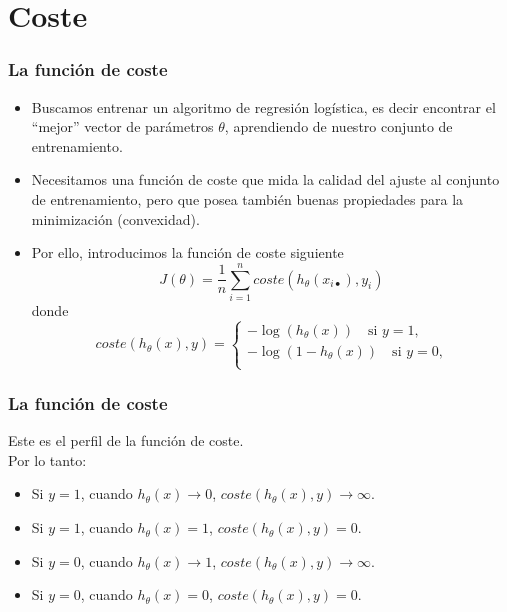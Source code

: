 \documentclass{beamer}
\begin{document}
\section{Coste}
\begin{frame}\frametitle{La función de coste}
  \begin{itemize}
  \item Buscamos entrenar un algoritmo de regresión logística, es decir encontrar el ``mejor'' vector de parámetros $\theta$, aprendiendo de nuestro conjunto de entrenamiento.
  \item<2->   Necesitamos una  función de coste que mida la calidad del ajuste al conjunto de entrenamiento, pero que posea también buenas propiedades para la minimización (convexidad).
  \item<3-> Por ello, introducimos la función de coste siguiente 
$$J(\theta)=\frac 1 n\sum_{i=1}^n coste(h_\theta(x_{i\bullet}),y_i)$$
donde 
$$
coste(h_\theta(x),y)= \left\{
\begin{array}{l}
  -\log(h_\theta(x))\quad \mbox{si $y=1$,}\\
  -\log(1-h_\theta(x))\quad \mbox{si $y=0$,}\\
\end{array}\right.
$$
  \end{itemize}
\end{frame}
\begin{frame}\frametitle{La función de coste}
 \begin{minipage}[t][5cm][t]{5.5cm}
          \end{minipage}
       \begin{minipage}[t][5cm][t]{5cm}
         \footnotesize
 Este es el perfil de la función de coste.\\
 Por lo tanto: 
 \begin{itemize}
 \item Si $y=1$, cuando $h_\theta(x)\to 0$, $coste(h_\theta(x),y)\to\infty$.
 \item Si $y=1$, cuando $h_\theta(x)=1$, $coste(h_\theta(x),y)=0$.
 \item Si $y=0$, cuando $h_\theta(x)\to 1$, $coste(h_\theta(x),y)\to\infty$.
 \item Si $y=0$, cuando $h_\theta(x)=0$, $coste(h_\theta(x),y)=0$.
 \end{itemize}
     \end{minipage}       
  
\end{frame}
\end{document}
